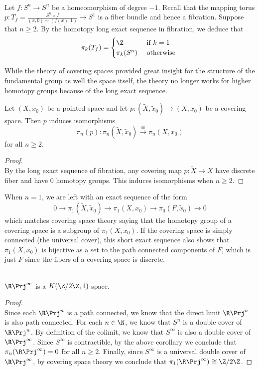 \documentclass[a4paper]{article}
\begin{document}
\begin{eg}{}{}\\
Let $f:S^n\to S^n$ be a homeomorphism of degree $-1$. Recall that the mapping torus $p:T_f=\frac{S^n\times I}{(x,0)\sim(f(x),1)}\to S^1$ is a fiber bundle and hence a fibration. Suppose that $n\geq 2$. By the homotopy long exact sequence in fibration, we deduce that $$\pi_k(T_f)=\begin{cases}
\Z & \text{ if }k=1\\
\pi_k(S^n) & \text{ otherwise }
\end{cases}$$
\end{eg}

While the theory of covering spaces provided great insight for the structure of the fundamental group as well the space itself, the theory no longer works for higher homotopy groups because of the long exact sequence. 

\begin{crl}{}{} Let $(X,x_0)$ be a pointed space and let $p:(\tilde{X},\tilde{x}_0)\to(X,x_0)$ be a covering space. Then $p$ induces isomorphisms $$\pi_n(p):\pi_n(\tilde{X},\tilde{x}_0)\overset{\cong}{\longrightarrow}\pi_n(X,x_0)$$ for all $n\geq 2$. 
\begin{proof}\\
By the long exact sequence of fibration, any covering map $p:\tilde{X}\to X$ have discrete fiber and have $0$ homotopy groups. This induces isomorphisms when $n\geq 2$. 
\end{proof}
\end{crl}

When $n=1$, we are left with an exact sequence of the form $$0\to\pi_1(\widetilde{X},\tilde{x}_0)\to\pi_1(X,x_0)\to\pi_0(F,\tilde{x}_0)\to 0$$ which matches covering space theory saying that the homotopy group of a covering space is a subgroup of $\pi_1(X,x_0)$. If the covering space is simply connected (the universal cover), this short exact sequence also shows that $\pi_1(X,x_0)$ is bijective as a set to the path connected components of $F$, which is just $F$ since the fibers of a covering space is discrete. 

\begin{eg}{}{}\\
$\R\Prj^\infty$ is a $K(\Z/2\Z,1)$ space. 
\begin{proof}\\
Since each $\R\Prj^n$ is a path connected, we know that the direct limit $\R\Prj^n$ is also path connected. For each $n\in\N$, we know that $S^n$ is a double cover of $\R\Prj^n$. By definition of the colimit, we know that $S^\infty$ is also a double cover of $\R\Prj^\infty$. Since $S^\infty$ is contractible, by the above corollary we conclude that $\pi_n(\R\Prj^\infty)=0$ for all $n\geq 2$. Finally, since $S^\infty$ is a universal double cover of $\R\Prj^\infty$, by covering space theory we conclude that $\pi_1(\R\Prj^\infty)\cong\Z/2\Z$. 
\end{proof}
\end{eg}
\end{document}
